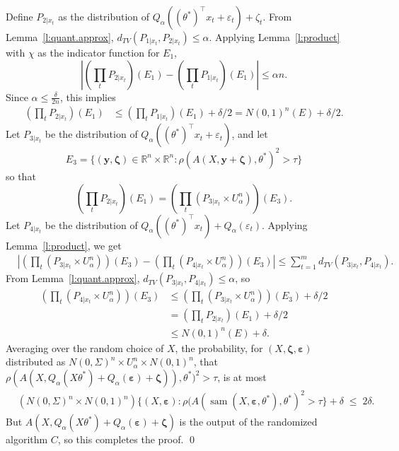 \documentclass[11pt,notitlepage]{article}
\newcommand\R {\mathbb{R}}
\newcommand\bs {\boldsymbol}
\newcommand\sam {\ensuremath{\operatorname{\mathrm{sam}}}}
\newcommand\eps {\varepsilon}
\begin{document}
Define $P_{2|x_t}$ as the distribution of
$Q_{\alpha} ((\theta^*)^{\top} x_t + \eps_t) + \zeta_t$.
From Lemma~\ref{l:quant.approx},
$d_{TV}(P_{1|x_t}, P_{2|x_t}) \leq \alpha$.
Applying Lemma~\ref{l:product} with $\chi$ as
the indicator function for $E_1$,
\[
\left| 
\left( \prod_t P_{2|x_t} \right) (E_1) - \left( \prod_t P_{1|x_t} \right) (E_1) 
\right|
 \leq \alpha n.
\]
Since $\alpha \leq \frac{\delta}{2 n}$, this implies
\begin{align*}
\left( \prod_t P_{2|x_t} \right) (E_1)
& \leq \left( \prod_t P_{1|x_t} \right) (E_1)
      + \delta/2 
= N(0,1)^n (E) + \delta/2.
\end{align*}
Let $P_{3|x_t}$ be the distribution of $Q_{\alpha} ((\theta^*)^{\top} x_t + \eps_t)$,
and let
\[
E_3 =  \{ (\bs{y}, \bs{\zeta}) \in \R^n \times \R^n:
      \rho( A(X,\bs{y} + \bs{\zeta}), \theta^*)^2 > \tau
       \}
\]
so that
\[
\left( \prod_t P_{2|x_t} \right) (E_1)
 = \left( \prod_t ( P_{3|x_t} \times U_{\alpha}^n) \right) (E_3).
\]
Let $P_{4|x_t}$ be the distribution of 
$Q_{\alpha} ((\theta^*)^{\top} x_t) + Q_{\alpha} (\eps_t)$.
Applying Lemma~\ref{l:product}, we get
\begin{align*}
& \left|
\left( \prod_t ( P_{3|x_t} \times U_{\alpha}^n) \right) (E_3)
 - \left( \prod_t ( P_{4|x_t} \times U_{\alpha}^n) \right) (E_3)
\right| 
\leq \sum_{t=1}^m d_{TV}(P_{3|x_t}, P_{4|x_t}).
\end{align*}
From Lemma~\ref{l:quant.approx}, $d_{TV}(P_{3|x_t}, P_{4|x_t}) \leq \alpha$,
so
\begin{align*}
\left( \prod_t ( P_{4|x_t} \times U_{\alpha}^n) \right) (E_3)
 & \leq \left( \prod_t ( P_{3|x_t} \times U_{\alpha}^n) \right) (E_3)
      + \delta/2 \\
 & = \left( \prod_t P_{2|x_t} \right) (E_1)
      + \delta/2 \\
 & \leq N(0,1)^n (E)
      + \delta.
\end{align*}
Averaging over the random choice of $X$,
the probability, for 
$(X, \bs{\zeta}, \bs{\eps})$
distributed as $N(0,\Sigma)^n \times U_{\alpha}^n \times N(0,1)^n$,
that
$\rho(A (X, Q_{\alpha} (X \theta^*)
                    + Q_{\alpha} (\bs{\eps})
                    + \bs{\zeta})),
         \theta^*)^2 > \tau$, is at most
\begin{align*}
& (N(0,\Sigma)^n \times N(0,1)^n)
 \{ (X, \bs{\eps}) :
    \rho(A (\sam(X, \bs{\eps}, \theta^*), \theta^*)^2 > \tau \}  + \delta 
  \;\leq\; 2 \delta.
\end{align*}
But $A (X, Q_{\alpha} (X \theta^*)
                    + Q_{\alpha} (\bs{\eps})
                    + \bs{\zeta})$ is the output of
the randomized algorithm $C$, so this completes the proof. \qed
\end{document}
